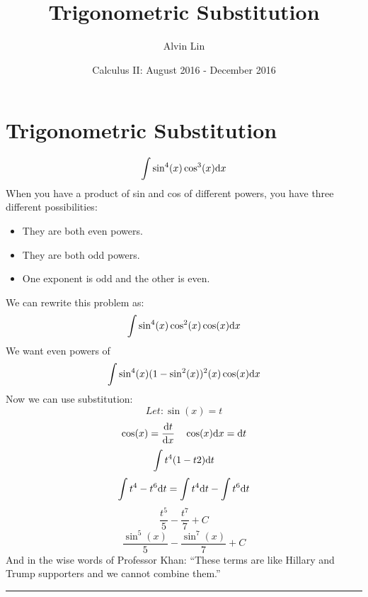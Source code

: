 \documentclass{math}
\title{Trigonometric Substitution}
\author{Alvin Lin}
\date{Calculus II: August 2016 - December 2016}
\begin{document}
\maketitle

\section*{Trigonometric Substitution}
\[ \int{\sin^{4}(x)\cos^{3}(x)\mathrm{d}{x}} \]
When you have a product of sin and cos of different powers,
you have three different possibilities:
\begin{itemize}
  \item They are both even powers.
  \item They are both odd powers.
  \item One exponent is odd and the other is even.
\end{itemize}
We can rewrite this problem as:
\[ \int{\sin^{4}(x)\cos^{2}(x)\cos(x)\mathrm{d}{x}} \]
We want even powers of
\[ \int{\sin^{4}(x)(1-\sin^{2}(x))^{2}(x)\cos(x)\mathrm{d}{x}} \]
Now we can use substitution:
\[ Let: \sin(x) = t \]
\[ \cos(x) = \frac{\mathrm{d}{t}}{\mathrm{d}{x}} \quad \cos(x)\mathrm{d}{x} = \mathrm{d}{t} \]
\[ \int{t^{4}(1-t{2})\mathrm{d}{t}} \]
\[ \int{t^{4}-t^{6}\mathrm{d}{t}} = \int{t^{4}\mathrm{d}{t}}-\int{t^{6}\mathrm{d}{t}} \]
\[ \frac{t^{5}}{5}-\frac{t^{7}}{7}+C \]
\[ \frac{\sin^{5}(x)}{5}-\frac{\sin^{7}(x)}{7}+C \]
And in the wise words of Professor Khan: ``These terms are like Hillary and
Trump supporters and we cannot combine them.''

\noindent\rule{13.7cm}{0.4pt}
\end{document}
